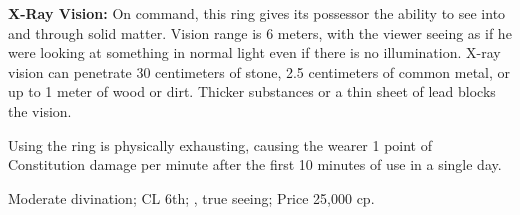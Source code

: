 \textbf{X-Ray Vision:} On command, this ring gives its possessor the ability to see into and through solid matter. Vision range is 6 meters, with the viewer seeing as if he were looking at something in normal light even if there is no illumination. X-ray vision can penetrate 30 centimeters of stone, 2.5 centimeters of common metal, or up to 1 meter of wood or dirt. Thicker substances or a thin sheet of lead blocks the vision.

Using the ring is physically exhausting, causing the wearer 1 point of Constitution damage per minute after the first 10 minutes of use in a single day.

Moderate divination; CL 6th; , true seeing; Price 25,000 cp.

